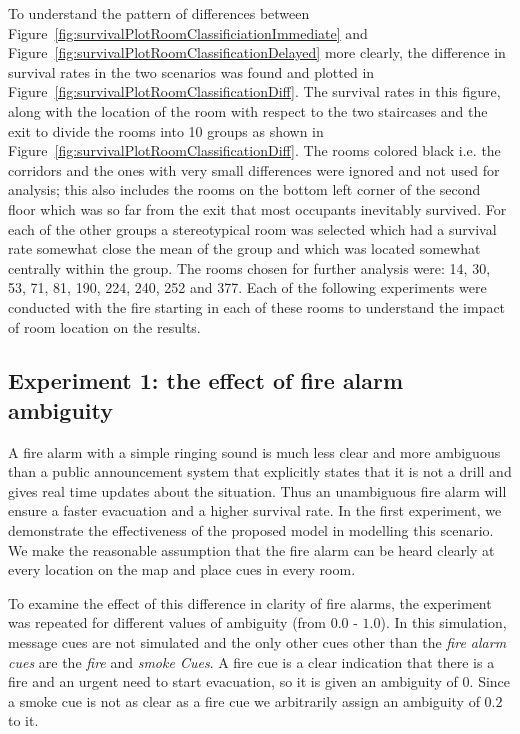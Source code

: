 To understand the pattern of differences between Figure~\ref{fig:survivalPlotRoomClassificiationImmediate} and Figure~\ref{fig:survivalPlotRoomClassificationDelayed} more clearly, the difference in survival rates in the two scenarios was found and plotted in Figure~\ref{fig:survivalPlotRoomClassificationDiff}. The survival rates in this figure, along with the location of the room with respect to the two staircases and the exit to divide the rooms into 10 groups as shown in Figure~\ref{fig:survivalPlotRoomClassificationDiff}. The rooms colored black i.e. the corridors and the ones with very small differences were ignored and not used for analysis; this also includes the rooms on the bottom left corner of the second floor which was so far from the exit that most occupants inevitably survived. For each of the other groups a stereotypical room was selected which had a survival rate somewhat close the mean of the group and which was located somewhat centrally within the group. The rooms chosen for further analysis were: 14, 30, 53, 71, 81, 190, 224, 240, 252 and 377. Each of the following experiments were conducted with the fire starting in each of these rooms to understand the impact of room location on the results.



\subsection{Experiment 1: the effect of fire alarm ambiguity}
\label{PreEvac:experiment1}

A fire alarm with a simple ringing sound is much less clear and more ambiguous than a public announcement system that explicitly states that it is not a drill and gives real time updates about the situation. Thus an unambiguous fire alarm will ensure a faster evacuation and a higher survival rate. In the first experiment, we demonstrate the effectiveness of the proposed model in modelling this scenario. We make the reasonable assumption that the fire alarm can be heard clearly at every location on the map and place cues in every room.

To examine the effect of this difference in clarity of fire alarms, the experiment was repeated for different values of ambiguity (from $0.0$ - $1.0$). In this simulation, message cues are not simulated and the only other cues other than the \emph{fire alarm cues }are the \emph{fire} and \emph{smoke Cues}. A fire cue is a clear indication that there is a fire and an urgent need to start evacuation, so it is given an ambiguity of $0$. Since a smoke cue is not as clear as a fire cue we arbitrarily assign an ambiguity of $0.2$ to it.

